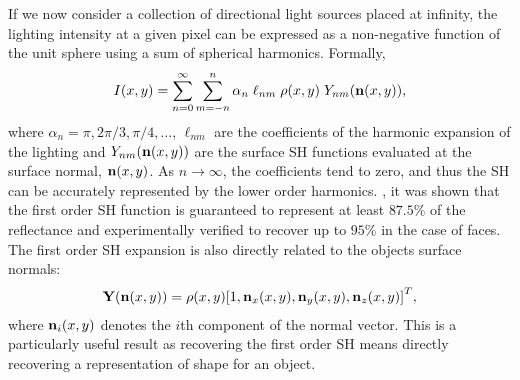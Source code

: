 If we now consider a collection of directional light sources placed at infinity,
the lighting intensity at a given pixel can be expressed as a non-negative
function of the unit sphere using a sum of spherical harmonics. Formally,
\begin{equation}\label{eq:spherical_harmonics}
    I(x, y) = \sum^{\infty}_{n=0} \sum^{n}_{m=-n} \alpha_n \; \ell_{nm} \; \rho(x,y) \; Y_{nm}(\boldsymbol{\mathbf{n}}(x,y)),
\end{equation}
where $\alpha_n = \pi, 2\pi/3, \pi/4, \ldots$, $\ell_{nm}$ are the coefficients
of the harmonic expansion of the lighting and $Y_{nm}(\boldsymbol{\mathbf{n}}(x,y))$ are the
surface SH functions evaluated at the surface normal, $\boldsymbol{\mathbf{n}}(x,y)$. As
$n \rightarrow \infty$, the coefficients tend to zero, and thus the SH can be
accurately represented by the lower order harmonics. \citet{RefWorks:316}, it
was shown that the first order SH function is guaranteed to represent at least
$87.5\%$ of the reflectance and experimentally verified to recover up to $95\%$
in the case of faces. The first order SH expansion is also directly related to
the objects surface normals:
\begin{equation}\label{eq:first_order_spherical_harmonics}
    \begin{aligned}
        \boldsymbol{\mathbf{Y}}(\boldsymbol{\mathbf{n}}(x, y))  = \rho(x, y) {[ 1, \boldsymbol{\mathbf{n}}_{x}(x, y), \boldsymbol{\mathbf{n}}_{y}(x, y), \boldsymbol{\mathbf{n}}_{z}(x, y) ]}^T,
   \end{aligned}
\end{equation}
where $\boldsymbol{\mathbf{n}}_{i}(x, y)$ denotes the $i$th component of the normal vector. 
This is a particularly useful result as recovering the first order SH means 
directly recovering a representation of shape for an object.
